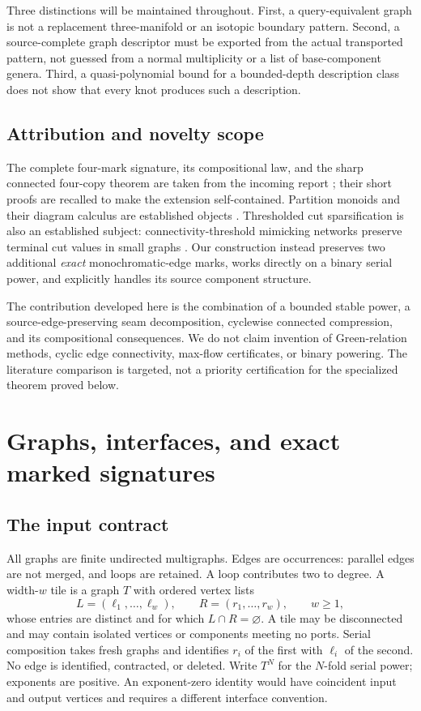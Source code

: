 \documentclass[11pt]{article}
\theoremstyle{remark}\newtheorem{remark}[theorem]{Remark}
\begin{document}
Three distinctions will be maintained throughout. First, a query-equivalent graph is not a replacement three-manifold or an isotopic boundary pattern. Second, a source-complete graph descriptor must be exported from the actual transported pattern, not guessed from a normal multiplicity or a list of base-component genera. Third, a quasi-polynomial bound for a bounded-depth description class does not show that every knot produces such a description.

\subsection{Attribution and novelty scope}
The complete four-mark signature, its compositional law, and the sharp connected four-copy theorem are taken from the incoming report \cite{fourcopy}; their short proofs are recalled to make the extension self-contained. Partition monoids and their diagram calculus are established objects \cite{eastgray}. Thresholded cut sparsification is also an established subject: connectivity-threshold mimicking networks preserve terminal cut values in small graphs \cite{mimicking,liu}. Our construction instead preserves two additional \emph{exact} monochromatic-edge marks, works directly on a binary serial power, and explicitly handles its source component structure.

The contribution developed here is the combination of a bounded stable power, a source-edge-preserving seam decomposition, cyclewise connected compression, and its compositional consequences. We do not claim invention of Green-relation methods, cyclic edge connectivity, max-flow certificates, or binary powering. The literature comparison is targeted, not a priority certification for the specialized theorem proved below.

\section{Graphs, interfaces, and exact marked signatures}
\subsection{The input contract}
All graphs are finite undirected multigraphs. Edges are occurrences: parallel edges are not merged, and loops are retained. A loop contributes two to degree. A width-$w$ tile is a graph $T$ with ordered vertex lists
\[
 L=(\ell_1,\ldots,\ell_w),\qquad R=(r_1,\ldots,r_w),\qquad w\ge1,
\]
whose entries are distinct and for which $L\cap R=\varnothing$. A tile may be disconnected and may contain isolated vertices or components meeting no ports. Serial composition takes fresh graphs and identifies $r_i$ of the first with $\ell_i$ of the second. No edge is identified, contracted, or deleted. Write $T^N$ for the $N$-fold serial power; exponents are positive. An exponent-zero identity would have coincident input and output vertices and requires a different interface convention.
\end{document}
